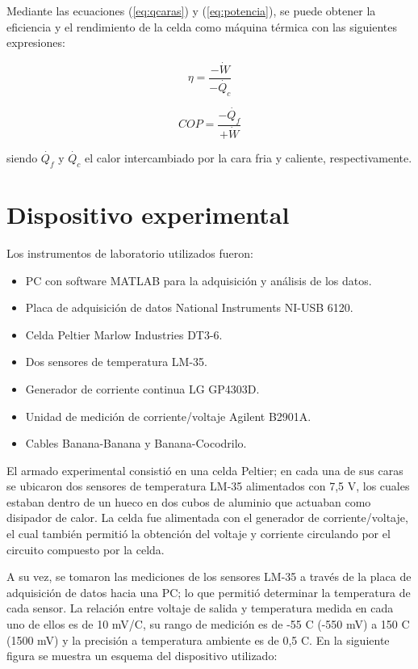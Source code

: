 \documentclass[twoside,twocolumn,a4paper]{article}
\begin{document}
Mediante las ecuaciones (\ref{eq:qcaras}) y (\ref{eq:potencia}), se puede obtener la eficiencia y el rendimiento de la celda como m\'aquina t\'ermica con las siguientes expresiones:


\begin{equation}
\label{eq:eficiencia}
\eta = \frac{-\dot{W}}{-\dot{Q_{c}}}
\end{equation}

\begin{equation}
\label{eq:rendimiento}
COP = \frac{-\dot{Q_{f}}}{+\dot{W}}
\end{equation}

siendo $\dot{Q_{f}}$ y $\dot{Q_{c}}$ el calor intercambiado por la cara fria y caliente, respectivamente.




\section{Dispositivo experimental}

Los instrumentos de laboratorio utilizados fueron:
\begin{itemize}
\item PC con software MATLAB para la adquisici\'on y an\'alisis de los datos.
\item Placa de adquisici\'on de datos National Instruments NI-USB 6120.
\item Celda Peltier Marlow Industries DT3-6.
\item Dos sensores de temperatura LM-35.
\item Generador de corriente continua LG GP4303D.
\item Unidad de medici\'on de corriente/voltaje Agilent B2901A.
\item Cables Banana-Banana y Banana-Cocodrilo.
\end{itemize}


El armado experimental consisti\'o en una celda Peltier; en cada una de sus caras se ubicaron dos sensores de temperatura LM-35 alimentados con 7,5 V, los cuales estaban dentro de un hueco en dos cubos de aluminio que actuaban como disipador de calor. La celda fue alimentada con el generador de corriente/voltaje, el cual tambi\'en permiti\'o la obtenci\'on del voltaje y corriente circulando por el circuito compuesto por la celda.

A su vez, se tomaron las mediciones de los sensores LM-35 a trav\'es de la placa de adquisici\'on de datos hacia una PC; lo que permiti\'o determinar la temperatura de cada sensor. La relaci\'on entre voltaje de salida y temperatura medida en cada uno de ellos es de 10 mV/\degree C, su rango de medici\'on es de -55 \degree C (-550 mV) a 150 \degree C (1500 mV) y la precisi\'on a temperatura ambiente es de 0,5 \degree C. En la siguiente figura se muestra un esquema del dispositivo utilizado:
\end{document}
